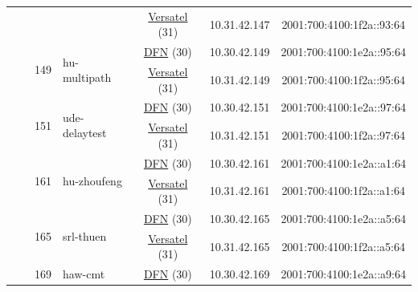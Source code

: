 \begin{small}
\begin{center}
\begin{longtable}{|c|c|c|c|c|c|c|c|}
  &  &  &  & \multicolumn{2}{|c|}{\tiny{\href{http://www.versatel.de}{Versatel} (31)}} & \tiny{10.31.42.147} & \tiny{2001:700:4100:1f2a::93:64} \\* \cline{3-3}\cline{4-4}\cline{5-5}\cline{6-6}\cline{7-7}\cline{8-8}
  &  & \multirow{2}{*}{\tiny{149}} & \multicolumn{1}{|l|}{\multirow{2}{*}{\tiny{hu-multipath}}} & \multicolumn{2}{|c|}{\tiny{\href{https://www.dfn.de}{DFN} (30)}} & \tiny{10.30.42.149} & \tiny{2001:700:4100:1e2a::95:64} \\* \cline{5-5}\cline{6-6}\cline{7-7}\cline{8-8}
  &  &  &  & \multicolumn{2}{|c|}{\tiny{\href{http://www.versatel.de}{Versatel} (31)}} & \tiny{10.31.42.149} & \tiny{2001:700:4100:1f2a::95:64} \\* \cline{3-3}\cline{4-4}\cline{5-5}\cline{6-6}\cline{7-7}\cline{8-8}
  &  & \multirow{2}{*}{\tiny{151}} & \multicolumn{1}{|l|}{\multirow{2}{*}{\tiny{ude-delaytest}}} & \multicolumn{2}{|c|}{\tiny{\href{https://www.dfn.de}{DFN} (30)}} & \tiny{10.30.42.151} & \tiny{2001:700:4100:1e2a::97:64} \\* \cline{5-5}\cline{6-6}\cline{7-7}\cline{8-8}
  &  &  &  & \multicolumn{2}{|c|}{\tiny{\href{http://www.versatel.de}{Versatel} (31)}} & \tiny{10.31.42.151} & \tiny{2001:700:4100:1f2a::97:64} \\* \cline{3-3}\cline{4-4}\cline{5-5}\cline{6-6}\cline{7-7}\cline{8-8}
  &  & \multirow{2}{*}{\tiny{161}} & \multicolumn{1}{|l|}{\multirow{2}{*}{\tiny{hu-zhoufeng}}} & \multicolumn{2}{|c|}{\tiny{\href{https://www.dfn.de}{DFN} (30)}} & \tiny{10.30.42.161} & \tiny{2001:700:4100:1e2a::a1:64} \\* \cline{5-5}\cline{6-6}\cline{7-7}\cline{8-8}
  &  &  &  & \multicolumn{2}{|c|}{\tiny{\href{http://www.versatel.de}{Versatel} (31)}} & \tiny{10.31.42.161} & \tiny{2001:700:4100:1f2a::a1:64} \\* \cline{3-3}\cline{4-4}\cline{5-5}\cline{6-6}\cline{7-7}\cline{8-8}
  &  & \multirow{2}{*}{\tiny{165}} & \multicolumn{1}{|l|}{\multirow{2}{*}{\tiny{srl-thuen}}} & \multicolumn{2}{|c|}{\tiny{\href{https://www.dfn.de}{DFN} (30)}} & \tiny{10.30.42.165} & \tiny{2001:700:4100:1e2a::a5:64} \\* \cline{5-5}\cline{6-6}\cline{7-7}\cline{8-8}
  &  &  &  & \multicolumn{2}{|c|}{\tiny{\href{http://www.versatel.de}{Versatel} (31)}} & \tiny{10.31.42.165} & \tiny{2001:700:4100:1f2a::a5:64} \\* \cline{3-3}\cline{4-4}\cline{5-5}\cline{6-6}\cline{7-7}\cline{8-8}
  &  & \multirow{2}{*}{\tiny{169}} & \multicolumn{1}{|l|}{\multirow{2}{*}{\tiny{haw-cmt}}} & \multicolumn{2}{|c|}{\tiny{\href{https://www.dfn.de}{DFN} (30)}} & \tiny{10.30.42.169} & \tiny{2001:700:4100:1e2a::a9:64} \\* \cline{5-5}\cline{6-6}\cline{7-7}\cline{8-8}

\end{longtable}
\end{center}
\end{small}
